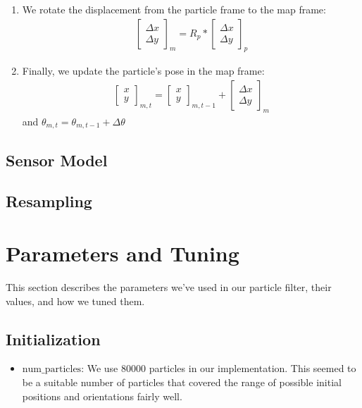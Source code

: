 \documentclass[11pt]{article}
\begin{document}
\begin{enumerate}
\item We rotate the displacement from the particle frame to the map frame:
\begin{align*}
\begin{bmatrix}
\Delta x \\
\Delta y
\end{bmatrix}_{m} = 
R_{p} * \begin{bmatrix}
\Delta x \\
\Delta y
\end{bmatrix}_{p}
\end{align*}

\item Finally, we update the particle's pose in the map frame:
\begin{align*}
\begin{bmatrix}
x \\
y
\end{bmatrix}_{m,t} = 
\begin{bmatrix}
x \\
y
\end{bmatrix}_{m,t-1} +
\begin{bmatrix}
\Delta x \\
\Delta y
\end{bmatrix}_{m}
\end{align*}
and $\theta_{m,t} = \theta_{m,t-1} + \Delta \theta$
\end{enumerate}

\subsection{Sensor Model}

\subsection{Resampling}

\section{Parameters and Tuning}
This section describes the parameters we've used in our particle filter, their values, and how we tuned them.

\subsection{Initialization}
\begin{itemize}
\item $\text{num\_particles}$: We use 80000 particles in our implementation. This seemed to be a suitable number of particles that covered the range of possible initial positions and orientations fairly well.
\end{itemize}
\end{document}
